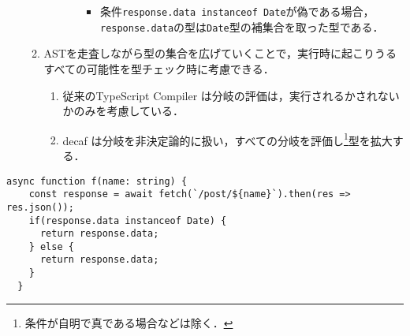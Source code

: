 \begin{enumerate}
\begin{enumerate}
\begin{enumerate}
\begin{itemize}
\begin{itemize}
                                            \item 条件\texttt{response.data instanceof Date}が偽である場合，\texttt{response.data}の型は\texttt{Date}型の補集合を取った型である．
                                        \end{itemize}
                              \end{itemize}
                    \end{enumerate}
              \item ASTを走査しながら型の集合を広げていくことで，実行時に起こりうるすべての可能性を型チェック時に考慮できる．
                    \begin{enumerate}
                        \item 従来のTypeScript Compiler は分岐の評価は，実行されるかされないかのみを考慮している．
                        \item decaf は分岐を非決定論的に扱い，すべての分岐を評価し\footnote{条件が自明で真である場合などは除く．}型を拡大する．
                    \end{enumerate}
          \end{enumerate}
\end{enumerate}

\begin{lstlisting}[caption=例, label=lst:example]
  async function f(name: string) {
    const response = await fetch(`/post/${name}`).then(res => res.json());
    if(response.data instanceof Date) {
      return response.data;
    } else {
      return response.data;
    }
  }
\end{lstlisting}
